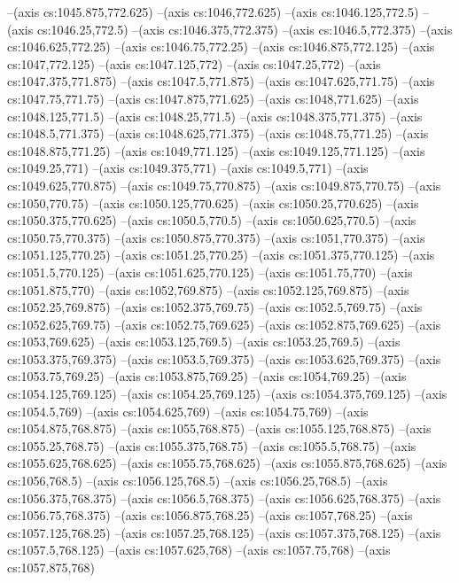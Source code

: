 --(axis cs:1045.875,772.625)
--(axis cs:1046,772.625)
--(axis cs:1046.125,772.5)
--(axis cs:1046.25,772.5)
--(axis cs:1046.375,772.375)
--(axis cs:1046.5,772.375)
--(axis cs:1046.625,772.25)
--(axis cs:1046.75,772.25)
--(axis cs:1046.875,772.125)
--(axis cs:1047,772.125)
--(axis cs:1047.125,772)
--(axis cs:1047.25,772)
--(axis cs:1047.375,771.875)
--(axis cs:1047.5,771.875)
--(axis cs:1047.625,771.75)
--(axis cs:1047.75,771.75)
--(axis cs:1047.875,771.625)
--(axis cs:1048,771.625)
--(axis cs:1048.125,771.5)
--(axis cs:1048.25,771.5)
--(axis cs:1048.375,771.375)
--(axis cs:1048.5,771.375)
--(axis cs:1048.625,771.375)
--(axis cs:1048.75,771.25)
--(axis cs:1048.875,771.25)
--(axis cs:1049,771.125)
--(axis cs:1049.125,771.125)
--(axis cs:1049.25,771)
--(axis cs:1049.375,771)
--(axis cs:1049.5,771)
--(axis cs:1049.625,770.875)
--(axis cs:1049.75,770.875)
--(axis cs:1049.875,770.75)
--(axis cs:1050,770.75)
--(axis cs:1050.125,770.625)
--(axis cs:1050.25,770.625)
--(axis cs:1050.375,770.625)
--(axis cs:1050.5,770.5)
--(axis cs:1050.625,770.5)
--(axis cs:1050.75,770.375)
--(axis cs:1050.875,770.375)
--(axis cs:1051,770.375)
--(axis cs:1051.125,770.25)
--(axis cs:1051.25,770.25)
--(axis cs:1051.375,770.125)
--(axis cs:1051.5,770.125)
--(axis cs:1051.625,770.125)
--(axis cs:1051.75,770)
--(axis cs:1051.875,770)
--(axis cs:1052,769.875)
--(axis cs:1052.125,769.875)
--(axis cs:1052.25,769.875)
--(axis cs:1052.375,769.75)
--(axis cs:1052.5,769.75)
--(axis cs:1052.625,769.75)
--(axis cs:1052.75,769.625)
--(axis cs:1052.875,769.625)
--(axis cs:1053,769.625)
--(axis cs:1053.125,769.5)
--(axis cs:1053.25,769.5)
--(axis cs:1053.375,769.375)
--(axis cs:1053.5,769.375)
--(axis cs:1053.625,769.375)
--(axis cs:1053.75,769.25)
--(axis cs:1053.875,769.25)
--(axis cs:1054,769.25)
--(axis cs:1054.125,769.125)
--(axis cs:1054.25,769.125)
--(axis cs:1054.375,769.125)
--(axis cs:1054.5,769)
--(axis cs:1054.625,769)
--(axis cs:1054.75,769)
--(axis cs:1054.875,768.875)
--(axis cs:1055,768.875)
--(axis cs:1055.125,768.875)
--(axis cs:1055.25,768.75)
--(axis cs:1055.375,768.75)
--(axis cs:1055.5,768.75)
--(axis cs:1055.625,768.625)
--(axis cs:1055.75,768.625)
--(axis cs:1055.875,768.625)
--(axis cs:1056,768.5)
--(axis cs:1056.125,768.5)
--(axis cs:1056.25,768.5)
--(axis cs:1056.375,768.375)
--(axis cs:1056.5,768.375)
--(axis cs:1056.625,768.375)
--(axis cs:1056.75,768.375)
--(axis cs:1056.875,768.25)
--(axis cs:1057,768.25)
--(axis cs:1057.125,768.25)
--(axis cs:1057.25,768.125)
--(axis cs:1057.375,768.125)
--(axis cs:1057.5,768.125)
--(axis cs:1057.625,768)
--(axis cs:1057.75,768)
--(axis cs:1057.875,768)
